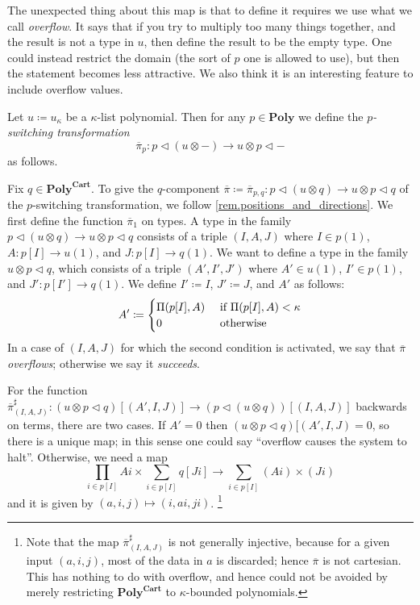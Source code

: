 \documentclass[11pt, one side, article]{memoir}
\theoremstyle{definition}
\theoremstyle{plain}
\newenvironment{definition}
  {\pushQED{\qed}\renewcommand{\qedsymbol}{$\lozenge$}\definitionx}
  {\popQED\enddefinitionx}
\newcommand{\Cat}[1]{\mathbf{#1}}%
\newcommand{\tn}[1]{\textnormal{#1}}
\newcommand{\ol}[1]{\overline{#1}}
\newcommand{\poly}{\Cat{Poly}}
\newcommand{\polycart}{\poly^{\Cat{Cart}}}
\newcommand{\0}{\textsf{0}}
\newcommand{\1}{\tn{\textsf{1}}}
\newcommand{\tri}{\mathbin{\triangleleft}}
\newcommand{\switch}{\pi}
\begin{document}
The unexpected thing about this map is that to define it requires we use what we call \emph{overflow}. It says that if you try to multiply too many things together, and the result is not a type in $u$, then define the result to be the empty type. One could instead restrict the domain (the sort of $p$ one is allowed to use), but then the statement becomes less attractive. We also think it is an interesting feature to include overflow values.

\begin{definition}[Switching transformation $\ol{\switch}$]\label{def.switching}
Let $u\coloneqq u_\kappa$ be a $\kappa$-list polynomial. Then for any $p\in\poly$ we define the \emph{$p$-switching transformation}
\[\ol{\switch}_{p}\colon p\tri(u\otimes -)\to u\otimes p\tri -\]
as follows.

Fix $q\in\polycart$. To give the $q$-component $\ol{\switch}\coloneqq\ol{\switch}_{p,q}\colon p\tri(u\otimes q)\to u\otimes p\tri q$ of the $p$-switching transformation, we follow \cref{rem.positions_and_directions}. We first define the function $\ol{\switch}_1$  on types. A type in the family $p\tri(u\otimes q)\to u\otimes p\tri q$ consists of a triple $(I,A,J)$ where $I\in p(1)$, $A\colon p[I]\to u(1)$, and $J\colon p[I]\to q(1)$. We want to define a type in the family $u\otimes p\tri q$, which consists of a triple $(A',I',J')$ where $A'\in u(1)$, $I'\in p(1)$, and $J'\colon p[I']\to q(1)$. We define $I'\coloneqq I$, $J'\coloneqq J$, and $A'$ as follows:
\begin{equation}\label{eqn.overflow}
  A'\coloneqq
  \begin{cases}
  	\Pi(p[I],A)&\tn{ if }\Pi(p[I],A)<\kappa\\
		0&\tn{ otherwise}
  \end{cases}
\end{equation}
In a case of $(I,A,J)$ for which the second condition is activated, we say that $\ol{\switch}$ \emph{overflows}; otherwise we say it \emph{succeeds}.

For the function $\ol{\switch}^\sharp_{(I,A,J)}\colon (u\otimes p\tri q)[(A',I,J)]\to(p\tri(u\otimes q))[(I,A,J)]$ backwards on terms, there are two cases. If $A'=0$ then $(u\otimes p\tri q)[(A',I,J)=0$, so there is a unique map; in this sense one could say ``overflow causes the system to halt''. Otherwise, we need a map
\begin{equation}\label{eqn.not_injective}
\prod_{i\in p[I]}A i\times\sum_{i\in p[I]}q[J i]\to\sum_{i\in p[I]}(A i)\times (J i)
\end{equation}
and it is given by $(a,i,j)\mapsto(i,a i,j i)$.%
\footnote{Note that the map $\ol{\switch}^\sharp_{(I,A,J)}$ is not generally injective, because for a given input $(a,i,j)$, most of the data in $a$ is discarded; hence $\ol{\switch}$ is not cartesian. This has nothing to do with overflow, and hence could not be avoided by merely restricting $\polycart$ to $\kappa$-bounded polynomials.}
\end{definition}
\end{document}
